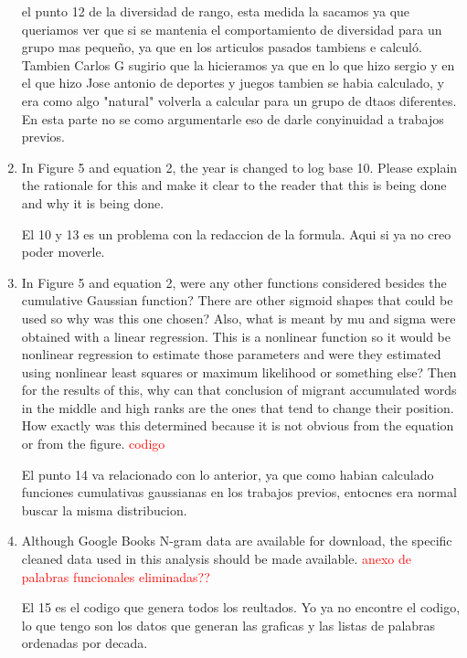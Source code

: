 \documentclass{article}
\begin{document}
\begin{enumerate}
el punto 12 de la diversidad de rango, esta medida la sacamos ya que queriamos ver que si se mantenia el comportamiento de diversidad para un grupo mas pequeño, ya que en los articulos pasados tambiens e calculó. Tambien Carlos G sugirio que la hicieramos ya que en lo que hizo sergio y en el que hizo Jose antonio de deportes y juegos tambien se habia calculado, y era como algo "natural" volverla a calcular para un grupo de dtaos diferentes. En esta parte no se como  argumentarle eso de darle conyinuidad a trabajos previos.
\item  In Figure 5 and equation 2, the year is changed to log base 10. 
Please explain the rationale for this and make it clear to the reader
that this is being done and why it is being done.


El 10 y 13 es un problema con la redaccion de la formula. Aqui si ya no creo poder moverle.

\item  In Figure 5 and equation 2, were any other functions considered 
besides the cumulative Gaussian function? There are other sigmoid
shapes that could be used so why was this one chosen? Also, what is
meant by mu and sigma were obtained with a linear regression. This is
a nonlinear function so it would be nonlinear regression to estimate
those parameters and were they estimated using nonlinear least squares
or maximum likelihood or something else? Then for the results of this,
why can that conclusion of migrant accumulated words in the middle and
high ranks are the ones that tend to change their position. How
exactly was this determined because it is not obvious from the
equation or from the figure. \textcolor{red}{codigo}

El punto 14 va relacionado con lo anterior, ya que como habian calculado funciones cumulativas gaussianas en los trabajos previos, entocnes era normal buscar la misma distribucion.


\item  Although Google Books N-gram data are available for download, the
specific cleaned data used in this analysis should be made available. \textcolor{red}{anexo de palabras funcionales eliminadas??}


El 15 es el codigo que genera todos los reultados. Yo ya no encontre el codigo, lo que tengo son los datos que generan las graficas y las listas de palabras ordenadas por decada. 

\end{enumerate}
\end{document}
